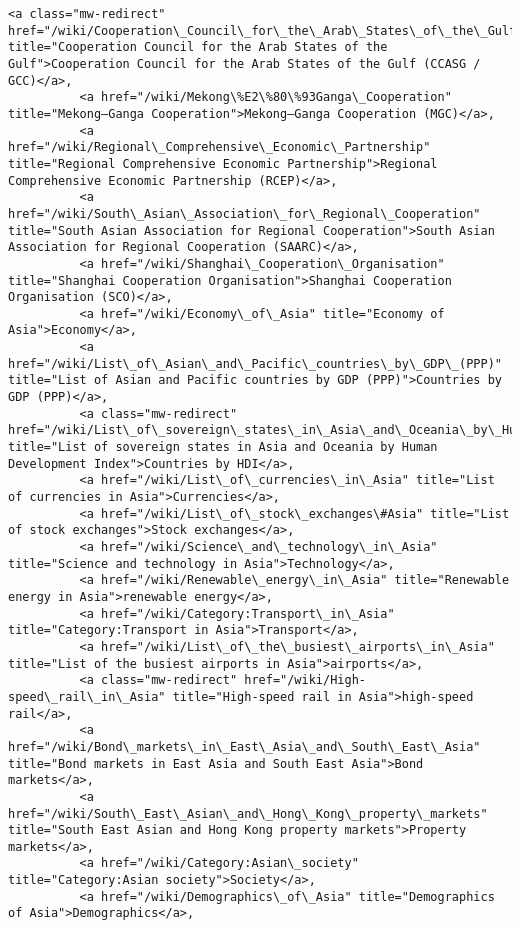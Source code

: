 \documentclass[11pt]{article}
\begin{document}
\begin{Verbatim}[commandchars=\\\{\}]
          <a class="mw-redirect" href="/wiki/Cooperation\_Council\_for\_the\_Arab\_States\_of\_the\_Gulf" title="Cooperation Council for the Arab States of the Gulf">Cooperation Council for the Arab States of the Gulf (CCASG / GCC)</a>,
          <a href="/wiki/Mekong\%E2\%80\%93Ganga\_Cooperation" title="Mekong–Ganga Cooperation">Mekong–Ganga Cooperation (MGC)</a>,
          <a href="/wiki/Regional\_Comprehensive\_Economic\_Partnership" title="Regional Comprehensive Economic Partnership">Regional Comprehensive Economic Partnership (RCEP)</a>,
          <a href="/wiki/South\_Asian\_Association\_for\_Regional\_Cooperation" title="South Asian Association for Regional Cooperation">South Asian Association for Regional Cooperation (SAARC)</a>,
          <a href="/wiki/Shanghai\_Cooperation\_Organisation" title="Shanghai Cooperation Organisation">Shanghai Cooperation Organisation (SCO)</a>,
          <a href="/wiki/Economy\_of\_Asia" title="Economy of Asia">Economy</a>,
          <a href="/wiki/List\_of\_Asian\_and\_Pacific\_countries\_by\_GDP\_(PPP)" title="List of Asian and Pacific countries by GDP (PPP)">Countries by GDP (PPP)</a>,
          <a class="mw-redirect" href="/wiki/List\_of\_sovereign\_states\_in\_Asia\_and\_Oceania\_by\_Human\_Development\_Index" title="List of sovereign states in Asia and Oceania by Human Development Index">Countries by HDI</a>,
          <a href="/wiki/List\_of\_currencies\_in\_Asia" title="List of currencies in Asia">Currencies</a>,
          <a href="/wiki/List\_of\_stock\_exchanges\#Asia" title="List of stock exchanges">Stock exchanges</a>,
          <a href="/wiki/Science\_and\_technology\_in\_Asia" title="Science and technology in Asia">Technology</a>,
          <a href="/wiki/Renewable\_energy\_in\_Asia" title="Renewable energy in Asia">renewable energy</a>,
          <a href="/wiki/Category:Transport\_in\_Asia" title="Category:Transport in Asia">Transport</a>,
          <a href="/wiki/List\_of\_the\_busiest\_airports\_in\_Asia" title="List of the busiest airports in Asia">airports</a>,
          <a class="mw-redirect" href="/wiki/High-speed\_rail\_in\_Asia" title="High-speed rail in Asia">high-speed rail</a>,
          <a href="/wiki/Bond\_markets\_in\_East\_Asia\_and\_South\_East\_Asia" title="Bond markets in East Asia and South East Asia">Bond markets</a>,
          <a href="/wiki/South\_East\_Asian\_and\_Hong\_Kong\_property\_markets" title="South East Asian and Hong Kong property markets">Property markets</a>,
          <a href="/wiki/Category:Asian\_society" title="Category:Asian society">Society</a>,
          <a href="/wiki/Demographics\_of\_Asia" title="Demographics of Asia">Demographics</a>,

\end{Verbatim}
\end{document}
